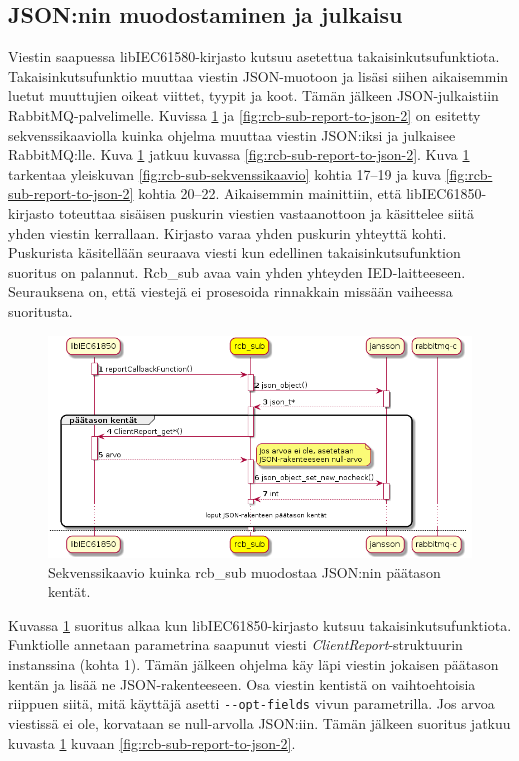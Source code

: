 \subsection{JSON:nin muodostaminen ja julkaisu}
Viestin saapuessa libIEC61580-kirjasto kutsuu asetettua takaisinkutsufunktiota. Takaisinkutsufunktio muuttaa viestin JSON-muotoon ja lisäsi siihen aikaisemmin luetut muuttujien oikeat viittet, tyypit ja koot. Tämän jälkeen JSON-julkaistiin RabbitMQ-palvelimelle. Kuvissa \ref{fig:rcb-sub-report-to-json-1} ja \ref{fig:rcb-sub-report-to-json-2} on esitetty sekvenssikaaviolla kuinka ohjelma muuttaa viestin JSON:iksi ja julkaisee RabbitMQ:lle. Kuva \ref{fig:rcb-sub-report-to-json-1} jatkuu kuvassa \ref{fig:rcb-sub-report-to-json-2}. Kuva \ref{fig:rcb-sub-report-to-json-1} tarkentaa yleiskuvan \ref{fig:rcb-sub-sekvenssikaavio} kohtia 17--19 ja kuva \ref{fig:rcb-sub-report-to-json-2} kohtia 20--22. Aikaisemmin mainittiin, että libIEC61850-kirjasto toteuttaa sisäisen puskurin viestien vastaanottoon ja käsittelee siitä yhden viestin kerrallaan. Kirjasto varaa yhden puskurin yhteyttä kohti. Puskurista käsitellään seuraava viesti kun edellinen takaisinkutsufunktion suoritus on palannut. Rcb\_sub avaa vain yhden yhteyden IED-laitteeseen. Seurauksena on, että viestejä ei prosesoida rinnakkain missään vaiheessa suoritusta.

\begin{figure}[ht!]
	\includegraphics[width=1\textwidth]{pictures/rcb-sub-report-to-json.png}
	\caption{Sekvenssikaavio kuinka rcb\_sub muodostaa JSON:nin päätason kentät.}
	\label{fig:rcb-sub-report-to-json-1}
\end{figure}

Kuvassa \ref{fig:rcb-sub-report-to-json-1} suoritus alkaa kun libIEC61850-kirjasto kutsuu takaisinkutsufunktiota. Funktiolle annetaan parametrina saapunut viesti \emph{ClientReport}-struktuurin instanssina (kohta 1). Tämän jälkeen ohjelma käy läpi viestin jokaisen päätason kentän ja lisää ne JSON-rakenteeseen. Osa viestin kentistä on vaihtoehtoisia riippuen siitä, mitä käyttäjä asetti \texttt{-{}-opt\--\-fields} vivun parametrilla. Jos arvoa viestissä ei ole, korvataan se null-arvolla JSON:iin. Tämän jälkeen suoritus jatkuu kuvasta \ref{fig:rcb-sub-report-to-json-1} kuvaan \ref{fig:rcb-sub-report-to-json-2}.

